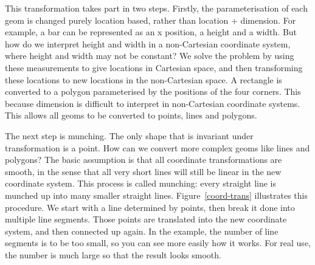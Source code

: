 This transformation takes part in two steps.  Firstly, the parameterisation of each geom is changed purely location based, rather than location + dimension.  For example, a bar can be represented as an x position, a height and a width.  But how do we interpret height and width in a non-Cartesian coordinate system, where height and width may not be constant?  We solve the problem by using these measurements to give locations in Cartesian space, and then transforming these locations to new locations in the non-Cartesian space.  A rectangle is converted to a polygon parameterised by the positions of the four corners.  This because dimension is difficult to interpret in non-Cartesian coordinate systems.  This allows all geoms to be converted to points, lines and polygons.  

The next step is munching.  The only shape that is invariant under transformation is a point.  How can we convert more complex geoms like lines and polygons?  The basic assumption is that all coordinate transformations are smooth, in the sense that all very short lines will still be linear in the new coordinate system.  This process is called munching: every straight line is munched up into many smaller straight lines.  Figure~\ref{coord-trans} illustrates this procedure.  We start with a line determined by points, then break it done into multiple line segments.  Those points are translated into the new coordinate system, and then connected up again.  In the example, the number of line segments is to be too small, so you can see more easily how it works.  For real use, the number is much large so that the result looks smooth.

% 
%
% 


